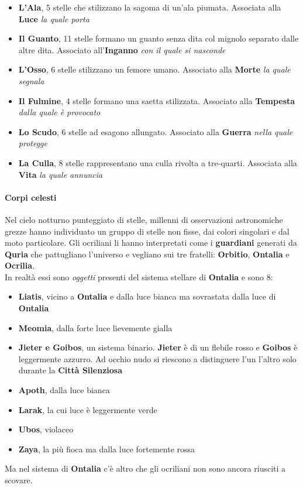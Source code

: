 \documentclass[10pt,twoside,onecolumn,openany]{book}
\begin{document}
\begin{multicols}{2}
\begin{itemize}
\item \textbf{L'Ala}, 5 stelle che stilizzano la sagoma di un'ala piumata. Associata alla \textbf{Luce} \textit{la quale porta}
\item \textbf{Il Guanto}, 11 stelle formano un guanto senza dita col mignolo separato dalle altre dita. Associato all'\textbf{Inganno} \textit{con il quale si nasconde}
\item \textbf{L'Osso}, 6 stelle stilizzano un femore umano. Associato alla \textbf{Morte} \textit{la quale segnala}
\item \textbf{Il Fulmine}, 4 stelle formano una saetta stilizzata. Associato alla \textbf{Tempesta} \textit{dalla quale è provocato}
\item \textbf{Lo Scudo}, 6 stelle ad esagono allungato. Associato alla \textbf{Guerra} \textit{nella quale protegge}
\item \textbf{La Culla}, 8 stelle rappresentano una culla rivolta a tre-quarti. Associata alla \textbf{Vita} \textit{la quale annuncia}
\end{itemize}
\end{multicols}
\paragraph{Corpi celesti} Nel cielo notturno punteggiato di stelle, millenni di osservazioni astronomiche grezze hanno individuato un gruppo di stelle non fisse, dai colori singolari e dal moto particolare. Gli ocriliani li hanno interpretati come i \textbf{guardiani} generati da \textbf{Quria} che pattugliano l'universo e vegliano sui tre fratelli: \textbf{Orbitio}, \textbf{Ontalia} e \textbf{Ocrilia}.\\
In realtà essi sono \textit{oggetti} presenti del sistema stellare di \textbf{Ontalia} e sono 8:
\begin{multicols}{2}
\begin{itemize}
\item \textbf{Liatis}, vicino a \textbf{Ontalia} e dalla luce bianca ma sovrastata dalla luce di \textbf{Ontalia}
\item \textbf{Meomia}, dalla forte luce lievemente gialla
\item \textbf{Jieter e Goibos}, un sistema binario. \textbf{Jieter} è di un flebile rosso e \textbf{Goibos} è leggermente azzurro. Ad occhio nudo si riescono a distinguere l'un l'altro solo durante la \textbf{Città Silenziosa}
\item \textbf{Apoth}, dalla luce bianca
\item \textbf{Larak}, la cui luce è leggermente verde
\item \textbf{Ubos}, violaceo
\item \textbf{Zaya}, la più fioca ma dalla luce fortemente rossa
\end{itemize}
\end{multicols}
Ma nel sistema di \textbf{Ontalia} c'è altro che gli ocriliani non sono ancora riusciti a scovare.
\pagebreak
\end{document}
